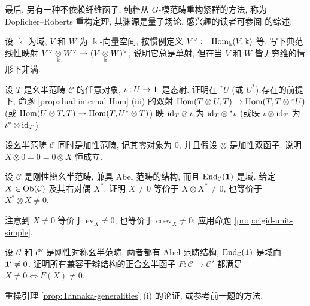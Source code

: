 最后, 另有一种不依赖纤维函子, 纯粹从 $G$-模范畴重构紧群的方法, 称为 Doplicher--Roberts 重构定理, 其渊源是量子场论. 感兴趣的读者可参阅 \cite{Mu07} 的综述.

\begin{Exercises}
	\item 设 $\Bbbk$ 为域, $V$ 和 $W$ 为 $\Bbbk$-向量空间, 按惯例定义 $V^\vee := \operatorname{Hom}_{\Bbbk}(V, \Bbbk)$ 等. 写下典范线性映射 $V^\vee \underset{\Bbbk}{\otimes} W^\vee \to (V \underset{\Bbbk}{\otimes} W)^\vee$, 说明它总是单射, 但在当 $V$ 和 $W$ 皆无穷维的情形下非满.
	
	\item 设 $T$ 是幺半范畴 $\mathcal{C}$ 的任意对象, $\iota: U \to \bm{1}$ 是态射. 证明在 ${}^* U$ (或 $U^*$) 存在的前提下, 命题 \ref{prop:dual-internal-Hom} (iii) 的双射 $\operatorname{Hom}(T \otimes U, T) \to \operatorname{Hom}(T, T \otimes {}^* U)$ (或 $\operatorname{Hom}(U \otimes T, T) \to \operatorname{Hom}(T, U^* \otimes T)$) 映 $\mathrm{id}_T \otimes \iota$ 为 $\mathrm{id}_T \otimes {}^* \iota$ (或映 $\iota \otimes \mathrm{id}_T$ 为 $\iota^* \otimes \mathrm{id}_T$).
	
	\item 设幺半范畴 $\mathcal{C}$ 同时是加性范畴, 记其零对象为 $0$, 并且假设 $\otimes$ 是加性双函子. 说明 $X \otimes 0  = 0 = 0 \otimes X$ 恒成立.
	
	\item 设 $\mathcal{C}$ 是刚性辫幺半范畴, 兼具 Abel 范畴的结构, 而且 $\operatorname{End}_{\mathcal{C}}(\bm{1})$ 是域. 给定 $X \in \operatorname{Ob}(\mathcal{C})$ 及其右对偶 $X^*$. 证明 $X \neq 0$ 等价于 $X \otimes X^* \neq 0$, 也等价于 $X^* \otimes X \neq 0$.
	\begin{hint}
		注意到 $X \neq 0$ 等价于 $\mathrm{ev}_X \neq 0$, 也等价于 $\mathrm{coev}_X \neq 0$; 应用命题 \ref{prop:rigid-unit-simple}.
	\end{hint}

	\item 设 $\mathcal{C}$ 和 $\mathcal{C}'$ 是刚性对称幺半范畴, 两者都有 Abel 范畴结构, $\operatorname{End}_{\mathcal{C}}(\bm{1})$ 是域而 $\bm{1}' \neq 0$. 证明所有兼容于辫结构的正合幺半函子 $F: \mathcal{C} \to \mathcal{C}'$ 都满足 $X \neq 0 \iff F(X) \neq 0$.
	\begin{hint}
		重操引理 \ref{prop:Tannaka-generalities} (i) 的论证, 或参考前一题的方法.
	\end{hint}
	

\end{Exercises}
